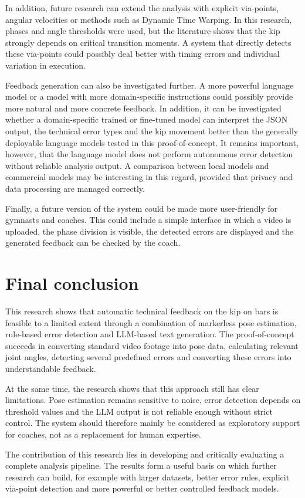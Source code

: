 In addition, future research can extend the analysis with explicit via-points, angular velocities or methods such as Dynamic Time Warping. In this research, phases and angle thresholds were used, but the literature shows that the kip strongly depends on critical transition moments. A system that directly detects these via-points could possibly deal better with timing errors and individual variation in execution.

Feedback generation can also be investigated further. A more powerful language model or a model with more domain-specific instructions could possibly provide more natural and more concrete feedback. In addition, it can be investigated whether a domain-specific trained or fine-tuned model can interpret the JSON output, the technical error types and the kip movement better than the generally deployable language models tested in this proof-of-concept. It remains important, however, that the language model does not perform autonomous error detection without reliable analysis output. A comparison between local models and commercial models may be interesting in this regard, provided that privacy and data processing are managed correctly.

Finally, a future version of the system could be made more user-friendly for gymnasts and coaches. This could include a simple interface in which a video is uploaded, the phase division is visible, the detected errors are displayed and the generated feedback can be checked by the coach.

\section{Final conclusion}

This research shows that automatic technical feedback on the kip on bars is feasible to a limited extent through a combination of markerless pose estimation, rule-based error detection and LLM-based text generation. The proof-of-concept succeeds in converting standard video footage into pose data, calculating relevant joint angles, detecting several predefined errors and converting these errors into understandable feedback.

At the same time, the research shows that this approach still has clear limitations. Pose estimation remains sensitive to noise, error detection depends on threshold values and the LLM output is not reliable enough without strict control. The system should therefore mainly be considered as exploratory support for coaches, not as a replacement for human expertise.

The contribution of this research lies in developing and critically evaluating a complete analysis pipeline. The results form a useful basis on which further research can build, for example with larger datasets, better error rules, explicit via-point detection and more powerful or better controlled feedback models.

